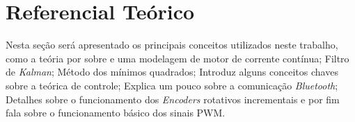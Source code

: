 \chapter[Referencial Teórico]{Referencial Teórico}
\label{ch:referencial_teorico}

Nesta seção será apresentado os principais conceitos utilizados neste trabalho, como a teória por sobre e uma modelagem de motor de corrente contínua; Filtro de \emph{Kalman}; Método dos mínimos quadrados; Introduz alguns conceitos chaves sobre a teórica de controle; Explica um pouco sobre a comunicação \emph{Bluetooth}; Detalhes sobre o funcionamento dos \emph{Encoders} rotativos incrementais e por fim fala sobre o funcionamento básico dos sinais PWM.







